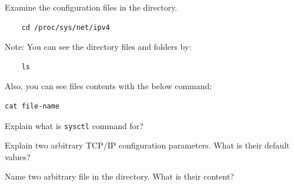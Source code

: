 \documentclass{UTNetLab}
\begin{document}
    Examine the configuration files in the  directory.    

	\begin{lstlisting}
	cd /proc/sys/net/ipv4
	\end{lstlisting}
	

    
   {Note:} You can see the directory files and folders by:

	\begin{lstlisting}
	ls
	\end{lstlisting}
	
	Also, you can see files contents with the below command:

	\begin{lstlisting}[emph={file-name}]
	cat file-name
	\end{lstlisting}

    \begin{report}
        \item Explain what is \lstinline{sysctl} command for?
            
        \item Explain two arbitrary TCP/IP configuration parameters.
                What is their default values?
            
        \item Name two arbitrary file in the  directory.
                What is their content?
    \end{report}
\end{document}

